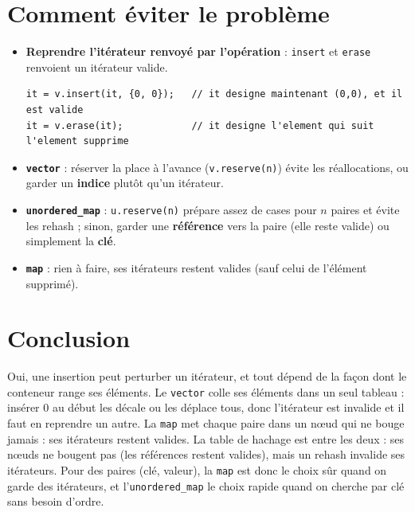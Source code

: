\documentclass[11pt,a4paper]{article}
\begin{document}
\section{Comment éviter le problème}

\begin{itemize}
  \item \textbf{Reprendre l'itérateur renvoyé par l'opération} : \texttt{insert} et
        \texttt{erase} renvoient un itérateur valide.
\begin{lstlisting}
it = v.insert(it, {0, 0});   // it designe maintenant (0,0), et il est valide
it = v.erase(it);            // it designe l'element qui suit l'element supprime
\end{lstlisting}
  \item \textbf{\texttt{vector}} : réserver la place à l'avance (\texttt{v.reserve(n)})
        évite les réallocations, ou garder un \textbf{indice} plutôt qu'un itérateur.
  \item \textbf{\texttt{unordered\_map}} : \texttt{u.reserve(n)} prépare assez de cases pour
        $n$ paires et évite les rehash ; sinon, garder une \textbf{référence} vers la paire
        (elle reste valide) ou simplement la \textbf{clé}.
  \item \textbf{\texttt{map}} : rien à faire, ses itérateurs restent valides (sauf celui de
        l'élément supprimé).
\end{itemize}

\section{Conclusion}

Oui, une insertion peut perturber un itérateur, et tout dépend de la façon dont le
conteneur range ses éléments. Le \texttt{vector} colle ses éléments dans un seul tableau :
insérer 0 au début les décale ou les déplace tous, donc l'itérateur est invalide et il faut
en reprendre un autre. La \texttt{map} met chaque paire dans un nœud qui ne bouge jamais :
ses itérateurs restent valides. La table de hachage est entre les deux : ses nœuds ne
bougent pas (les références restent valides), mais un rehash invalide ses itérateurs. Pour
des paires (clé, valeur), la \texttt{map} est donc le choix sûr quand on garde des
itérateurs, et l'\texttt{unordered\_map} le choix rapide quand on cherche par clé sans
besoin d'ordre.
\end{document}
